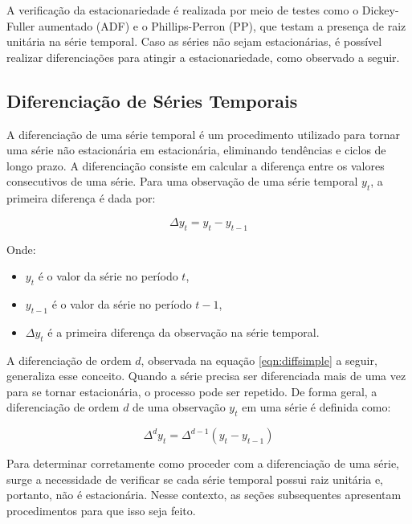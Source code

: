 \documentclass[12pt,oneside,a4paper,chapter=TITLE,english,brazil,sumario=abnt-6027-2012]{abntex2}
\begin{document}
A verificação da estacionariedade é realizada por meio de testes como o Dickey-Fuller aumentado (ADF) e o Phillips-Perron (PP), que testam a presença de raiz unitária na série temporal. Caso as séries não sejam estacionárias, é possível realizar diferenciações para atingir a estacionariedade, como observado a seguir.

\subsection{Diferenciação de Séries Temporais}

A diferenciação de uma série temporal é um procedimento utilizado para tornar uma série não estacionária em estacionária, eliminando tendências e ciclos de longo prazo. A diferenciação consiste em calcular a diferença entre os valores consecutivos de uma série. Para uma observação de uma série temporal \( y_t \), a primeira diferença é dada por:

\begin{equation}
	\Delta y_t = y_t - y_{t-1}
\end{equation}

Onde:

\begin{itemize}
	\item \( y_t \) é o valor da série no período \( t \),
	\item \( y_{t-1} \) é o valor da série no período \( t-1 \),
	\item \( \Delta y_t \) é a primeira diferença da observação na série temporal.
\end{itemize}

A diferenciação de ordem \( d \), observada na equação \ref{eqn:diffsimple} a seguir, generaliza esse conceito. Quando a série precisa ser diferenciada mais de uma vez para se tornar estacionária, o processo pode ser repetido. De forma geral, a diferenciação de ordem \( d \) de uma observação \( y_t \) em uma série é definida como:

\begin{equation}
	\label{eqn:diffsimple}
	\Delta^d y_t = \Delta^{d-1}(y_t - y_{t-1})
\end{equation}

Para determinar corretamente como proceder com a diferenciação de uma série, surge a necessidade de verificar se cada série temporal possui raiz unitária e, portanto, não é estacionária. Nesse contexto, as seções subsequentes apresentam procedimentos para que isso seja feito.
\end{document}
